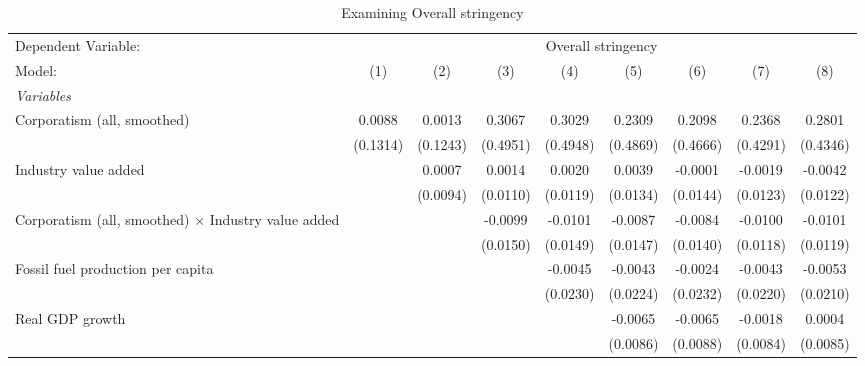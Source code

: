
\begin{table}[htbp]
   \caption{Examining Overall stringency}
   \centering
   \begin{tabular}{lcccccccc}
      \tabularnewline \midrule \midrule
      Dependent Variable: & \multicolumn{8}{c}{Overall stringency}\\
      Model:                                                     & (1)                   & (2)      & (3)      & (4)      & (5)      & (6)      & (7)      & (8)\\  
      \midrule
      \emph{Variables}\\
      Corporatism (all, smoothed)                                & 0.0088                & 0.0013   & 0.3067   & 0.3029   & 0.2309   & 0.2098   & 0.2368   & 0.2801\\   
                                                                 & (0.1314)              & (0.1243) & (0.4951) & (0.4948) & (0.4869) & (0.4666) & (0.4291) & (0.4346)\\   
      Industry value added                                       &                       & 0.0007   & 0.0014   & 0.0020   & 0.0039   & -0.0001  & -0.0019  & -0.0042\\   
                                                                 &                       & (0.0094) & (0.0110) & (0.0119) & (0.0134) & (0.0144) & (0.0123) & (0.0122)\\   
      Corporatism (all, smoothed) $\times$ Industry value added  &                       &          & -0.0099  & -0.0101  & -0.0087  & -0.0084  & -0.0100  & -0.0101\\   
                                                                 &                       &          & (0.0150) & (0.0149) & (0.0147) & (0.0140) & (0.0118) & (0.0119)\\   
      Fossil fuel production per capita                          &                       &          &          & -0.0045  & -0.0043  & -0.0024  & -0.0043  & -0.0053\\   
                                                                 &                       &          &          & (0.0230) & (0.0224) & (0.0232) & (0.0220) & (0.0210)\\   
      Real GDP growth                                            &                       &          &          &          & -0.0065  & -0.0065  & -0.0018  & 0.0004\\   
                                                                 &                       &          &          &          & (0.0086) & (0.0088) & (0.0084) & (0.0085)\\   

\end{tabular}
\end{table}
